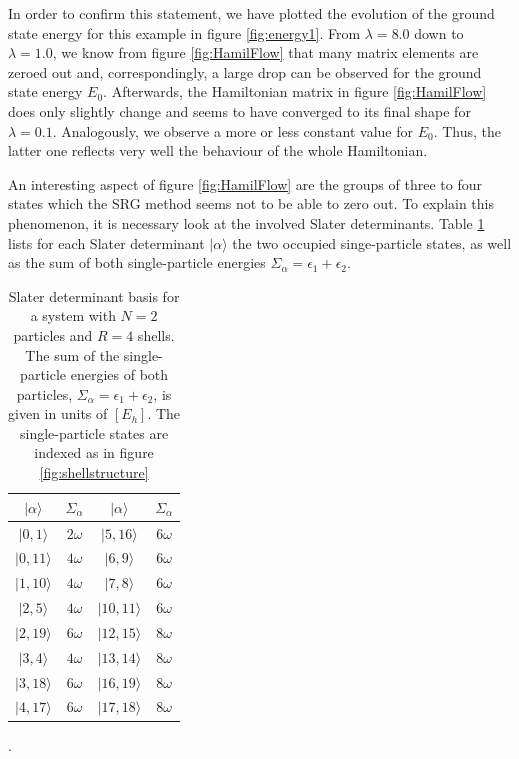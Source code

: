 In order to confirm this statement, we have plotted the evolution of the ground state energy for this example in figure \ref{fig:energy1}. From $\lambda = 8.0$ down to $\lambda = 1.0$, we know from figure \ref{fig:HamilFlow} that many matrix elements are zeroed out and, correspondingly, a large drop can be observed for the ground state energy $E_0$. Afterwards, the Hamiltonian matrix in figure \ref{fig:HamilFlow} does only slightly change and seems to have converged to its final shape for $\lambda = 0.1$. Analogously, we observe a more or less constant value for $E_0$. Thus, the latter one reflects very well the behaviour of the whole Hamiltonian.
 
An interesting aspect of figure \ref{fig:HamilFlow} are the groups of three to four states which the SRG method seems not to be able to zero out. To explain this phenomenon, it is necessary look at the involved Slater determinants. Table \ref{tab:SDs} lists for each Slater determinant $|\alpha\rangle$ the two occupied singe-particle states, as well as the sum of both single-particle energies $\Sigma_{\alpha} = \epsilon_1 + \epsilon_2$.\\
\begin{table}
\begin{center}
\begin{tabular}{cc|cc}
\hline\hline
$|\alpha\rangle$ & $\Sigma_{\alpha}$ & $|\alpha\rangle$ & $\Sigma_{\alpha}$\\
\hline
$|0,1\rangle$ & $2\omega$ & $|5,16\rangle$ & $6\omega$ \\
$|0,11\rangle$ & $4\omega$ & $|6,9\rangle$ & $6\omega$ \\
$|1,10\rangle$ & $4\omega$ & $|7,8\rangle$ & $6\omega$ \\
$|2,5\rangle$ & $4\omega$ & $|10,11\rangle$ & $6\omega$ \\
$|2,19\rangle$ & $6\omega$ & $|12,15\rangle$ & $8\omega$ \\
$|3,4\rangle$ & $4\omega$ & $|13,14\rangle$ & $8\omega$ \\
$|3,18\rangle$ & $6\omega$ & $|16,19\rangle$ & $8\omega$ \\
$|4,17\rangle$ & $6\omega$ & $|17,18\rangle$ & $8\omega$ \\
\hline\hline
\end{tabular}
\end{center}
\caption{Slater determinant basis for a system with $N=2$ particles and $R = 4$ shells. The sum of the single-particle energies of both particles, $\Sigma_{\alpha} = \epsilon_1 + \epsilon_2$, is given in units of  $\left[ E_h \right]$. The single-particle states are indexed as in figure \ref{fig:shellstructure}}.
\label{tab:SDs}
\end{table}
